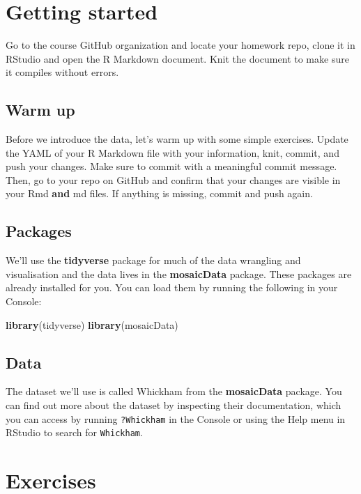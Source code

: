 \documentclass[
]{article}
\newenvironment{Shaded}{\begin{snugshade}}{\end{snugshade}}
\newcommand{\FunctionTok}[1]{\textcolor[rgb]{0.13,0.29,0.53}{\textbf{#1}}}
\newcommand{\NormalTok}[1]{#1}
\begin{document}
\section{Getting started}\label{getting-started}

Go to the course GitHub organization and locate your homework repo,
clone it in RStudio and open the R Markdown document. Knit the document
to make sure it compiles without errors.

\subsection{Warm up}\label{warm-up}

Before we introduce the data, let's warm up with some simple exercises.
Update the YAML of your R Markdown file with your information, knit,
commit, and push your changes. Make sure to commit with a meaningful
commit message. Then, go to your repo on GitHub and confirm that your
changes are visible in your Rmd \textbf{and} md files. If anything is
missing, commit and push again.

\subsection{Packages}\label{packages}

We'll use the \textbf{tidyverse} package for much of the data wrangling
and visualisation and the data lives in the \textbf{mosaicData} package.
These packages are already installed for you. You can load them by
running the following in your Console:

\begin{Shaded}
\begin{Highlighting}[]
\FunctionTok{library}\NormalTok{(tidyverse) }
\FunctionTok{library}\NormalTok{(mosaicData) }
\end{Highlighting}
\end{Shaded}

\subsection{Data}\label{data}

The dataset we'll use is called Whickham from the \textbf{mosaicData}
package. You can find out more about the dataset by inspecting their
documentation, which you can access by running \texttt{?Whickham} in the
Console or using the Help menu in RStudio to search for
\texttt{Whickham}.

\section{Exercises}\label{exercises}
\end{document}
